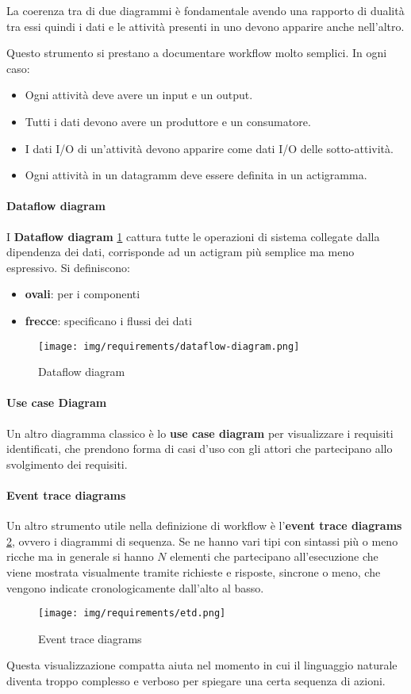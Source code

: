 La coerenza tra di due diagrammi è fondamentale avendo una rapporto di dualità
tra essi quindi i dati e le attività presenti in uno devono apparire anche nell'altro.

Questo strumento si prestano a documentare workflow molto semplici. In ogni caso:
\begin{itemize}
    \item Ogni attività deve avere un input e un output.
    \item Tutti i dati devono avere un produttore e un consumatore.
    \item I dati I/O di un'attività devono apparire come dati I/O delle sotto-attività.
    \item Ogni attività in un datagramm deve essere definita in un actigramma.
\end{itemize}
\paragraph{Dataflow diagram}
I \textbf{Dataflow diagram} \ref{fig:dataflow-diagram} cattura tutte le operazioni 
di sistema collegate dalla dipendenza dei dati, 
corrisponde ad un actigram più semplice ma meno espressivo. Si definiscono:
\begin{itemize}
	\item \textbf{ovali}: per i componenti
	\item \textbf{frecce}: specificano i flussi dei dati
\end{itemize}

\begin{figure}[!ht]
    \centering
    \texttt{[image: img/requirements/dataflow-diagram.png]}
    \caption{Dataflow diagram}
    \label{fig:dataflow-diagram}
\end{figure}

\paragraph{Use case Diagram}
Un altro diagramma classico è lo \textbf{use case diagram} per visualizzare i
requisiti identificati, che prendono forma di casi d'uso con gli attori che partecipano
allo svolgimento dei requisiti.
\paragraph{Event trace diagrams}
Un altro strumento utile nella definizione di workflow è l'\textbf{event trace diagrams}
\ref{fig:etd}, ovvero i diagrammi di sequenza. Se ne hanno vari tipi con sintassi
più o meno ricche ma in generale si hanno $N$ elementi che partecipano all'esecuzione
che viene mostrata visualmente tramite richieste e risposte, sincrone o meno,
che vengono indicate cronologicamente dall'alto al basso.
\begin{figure}[!ht]
    \centering
    \texttt{[image: img/requirements/etd.png]}
    \caption{Event trace diagrams}
    \label{fig:etd}
\end{figure}
Questa visualizzazione compatta aiuta nel momento in cui il linguaggio naturale
diventa troppo complesso e verboso per spiegare una certa sequenza di azioni.
